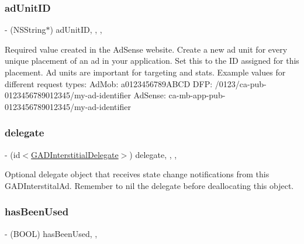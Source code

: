 \subsubsection{\texorpdfstring{ad\+Unit\+ID}{adUnitID}}
{\footnotesize\ttfamily -\/ (N\+S\+String$\ast$) ad\+Unit\+ID\hspace{0.3cm}{\ttfamily [read]}, {\ttfamily [write]}, {\ttfamily [nonatomic]}, {\ttfamily [copy]}}

Required value created in the Ad\+Sense website. Create a new ad unit for every unique placement of an ad in your application. Set this to the ID assigned for this placement. Ad units are important for targeting and stats. Example values for different request types\+: Ad\+Mob\+: a0123456789\+A\+B\+CD D\+FP\+: /0123/ca-\/pub-\/0123456789012345/my-\/ad-\/identifier Ad\+Sense\+: ca-\/mb-\/app-\/pub-\/0123456789012345/my-\/ad-\/identifier \mbox{\label{interfaceGADInterstitial_a174dfe74aa49a50ad6e8855d20c657d0}} 
\subsubsection{\texorpdfstring{delegate}{delegate}}
{\footnotesize\ttfamily -\/ (id$<$\hyperlink{protocolGADInterstitialDelegate-p}{G\+A\+D\+Interstitial\+Delegate}$>$) delegate\hspace{0.3cm}{\ttfamily [read]}, {\ttfamily [write]}, {\ttfamily [nonatomic]}, {\ttfamily [weak]}}

Optional delegate object that receives state change notifications from this G\+A\+D\+Interstital\+Ad. Remember to nil the delegate before deallocating this object. \mbox{\label{interfaceGADInterstitial_af862278c65bd83cb6a0e4db168fac029}} 
\subsubsection{\texorpdfstring{has\+Been\+Used}{hasBeenUsed}}
{\footnotesize\ttfamily -\/ (B\+O\+OL) has\+Been\+Used\hspace{0.3cm}{\ttfamily [read]}, {\ttfamily [nonatomic]}, {\ttfamily [assign]}}

